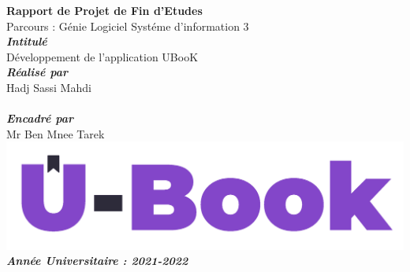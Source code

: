 \documentclass[12pt]{report}
\begin{document}
\begin{titlepage}
\begin{center}
        \textbf{\LARGE{Rapport de Projet de Fin d’Etudes}}
 		\vspace*{.5cm}
        {\\Parcours : Génie Logiciel Systéme d'information 3}
	    \vspace*{1cm}
    	\textbf{\emph{\\Intitulé}}   
        {\\Développement de l'application UBooK}
        \vspace*{1cm}
    	\textbf{\emph{\\Réalisé par}}   
        {\\Hadj Sassi Mahdi\\}
        \vspace*{1cm}
    	\textbf{\emph{\\Encadré par}}   
        {\\Mr Ben Mnee Tarek\\}
        \vspace*{1cm}
		\includegraphics[scale=.5]{u-book2} 		
		\vspace*{4cm}
    	\textbf{\emph{\\Année Universitaire : 2021-2022}} 
    \end{center}
\end{titlepage}
\ClearShipoutPicture

\maketitle
\begin{abstract}
\large{La découverte de la vérité, aussi appelée la recherche de la véracité, à devenu un des besoin dans le mégadonnée (Big Data) c'est le 4éme V. Nous avons développé une application web s'appelle UBooK pour l'échange des documents educatifs entre le formateur et l'apprenant, cet échange respecte la véracité d'information en vérifiant les métadonnées de ce documents bien précisemement le dicipline, l'auteur et l'année d'etablissement de document. Ces Informations sont vérifié à travers un modéle de machine learning basé sur un ensemble des arbres de décisions. UBooK est aussi concu pour le gestion des evenement universitaires, et pour garantir la véracité de déroulement des evenements et leurs inscriptions des participants, nous avons raccouri aussi vers un modéle de véracité utilisant le web scrapping.}
\end{abstract}
\end{document}
